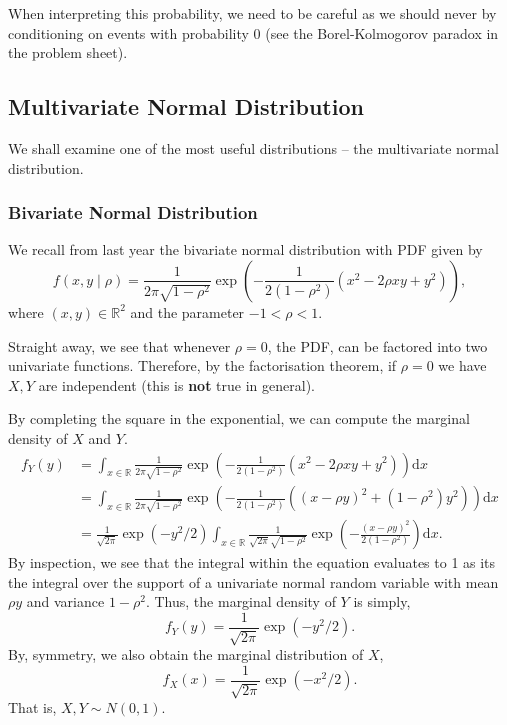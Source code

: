 \documentclass[
]{article}
\theoremstyle{definition}
\begin{document}
When interpreting this probability, we need to be careful as we should
never by conditioning on events with probability 0 (see the
Borel-Kolmogorov paradox in the problem sheet).

\hypertarget{multivariate-normal-distribution}{%
\subsection{Multivariate Normal
Distribution}\label{multivariate-normal-distribution}}

We shall examine one of the most useful distributions -- the
multivariate normal distribution.

\hypertarget{bivariate-normal-distribution}{%
\subsubsection{Bivariate Normal
Distribution}\label{bivariate-normal-distribution}}

We recall from last year the bivariate normal distribution with PDF
given by \[
  f(x, y \mid \rho) = \frac{1}{2\pi \sqrt{1 - \rho ^2}}
  \exp\left(-\frac{1}{2(1 - \rho ^2)}(x^2 - 2\rho x y + y^2) \right),
\] where \((x, y) \in \mathbb{R}^2\) and the parameter
\(-1 < \rho < 1\).

Straight away, we see that whenever \(\rho = 0\), the PDF, can be
factored into two univariate functions. Therefore, by the factorisation
theorem, if \(\rho = 0\) we have \(X, Y\) are independent (this is
\textbf{not} true in general).

By completing the square in the exponential, we can compute the marginal
density of \(X\) and \(Y\). \begin{align*}
  f_Y(y) & = \int_{x \in \mathbb{R}} \frac{1}{2\pi \sqrt{1 - \rho ^2}}
      \exp\left(-\frac{1}{2(1 - \rho ^2)}(x^2 - 2\rho x y + y^2) \right) \text{d}x\\
    & = \int_{x \in \mathbb{R}} \frac{1}{2\pi \sqrt{1 - \rho ^2}}
    \exp\left(-\frac{1}{2(1 - \rho ^2)}((x - \rho y)^2 + (1 - \rho ^2)y^2) \right) \text{d}x\\
    & = \frac{1}{\sqrt{2\pi}}\exp(-y^2/ 2) \int_{x \in \mathbb{R}}
    \frac{1}{\sqrt{2\pi}\sqrt{1 - \rho^2}}
    \exp\left(-\frac{(x - \rho y)^2}{2(1 - \rho ^2)} \right) \text{d}x.
\end{align*} By inspection, we see that the integral within the equation
evaluates to 1 as its the integral over the support of a univariate
normal random variable with mean \(\rho y\) and variance
\(1 - \rho ^2\). Thus, the marginal density of \(Y\) is simply,
\[f_Y(y) = \frac{1}{\sqrt{2\pi}}\exp(-y^2/ 2).\] By, symmetry, we also
obtain the marginal distribution of \(X\),
\[f_X(x) = \frac{1}{\sqrt{2\pi}}\exp(-x^2/ 2).\] That is,
\(X, Y \sim N(0, 1)\).
\end{document}

